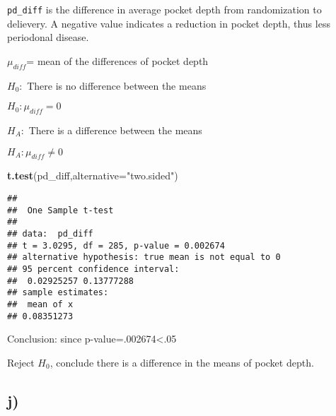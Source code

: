 \documentclass[]{article}
\newenvironment{Shaded}{\begin{snugshade}}{\end{snugshade}}
\newcommand{\KeywordTok}[1]{\textcolor[rgb]{0.13,0.29,0.53}{\textbf{#1}}}
\newcommand{\DataTypeTok}[1]{\textcolor[rgb]{0.13,0.29,0.53}{#1}}
\newcommand{\DecValTok}[1]{\textcolor[rgb]{0.00,0.00,0.81}{#1}}
\newcommand{\StringTok}[1]{\textcolor[rgb]{0.31,0.60,0.02}{#1}}
\newcommand{\OperatorTok}[1]{\textcolor[rgb]{0.81,0.36,0.00}{\textbf{#1}}}
\newcommand{\NormalTok}[1]{#1}
\begin{document}
\begin{Shaded}
\end{Shaded}

\texttt{pd\_diff} is the difference in average pocket depth from
randomization to delievery. A negative value indicates a reduction in
pocket depth, thus less periodonal disease.

\(\mu_{diff}\)= mean of the differences of pocket depth

\(H_0:\) There is no difference between the means

\(H_0: \mu_{diff}=0\)

\(H_A:\) There is a difference between the means

\(H_A: \mu_{diff} \neq 0\)

\begin{Shaded}
\begin{Highlighting}[]
\KeywordTok{t.test}\NormalTok{(pd_diff,}\DataTypeTok{alternative=}\StringTok{"two.sided"}\NormalTok{)}
\end{Highlighting}
\end{Shaded}

\begin{verbatim}
## 
##  One Sample t-test
## 
## data:  pd_diff
## t = 3.0295, df = 285, p-value = 0.002674
## alternative hypothesis: true mean is not equal to 0
## 95 percent confidence interval:
##  0.02925257 0.13777288
## sample estimates:
##  mean of x 
## 0.08351273
\end{verbatim}

Conclusion: since p-value=.002674\textless{}.05

Reject \(H_0\), conclude there is a difference in the means of pocket
depth.

\subsection{j)}\label{j}

\begin{Shaded}
\end{Shaded}
\end{document}
